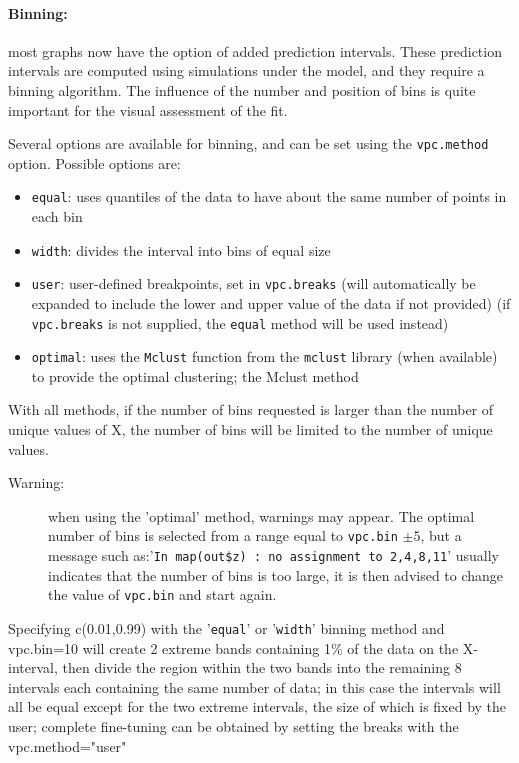 \paragraph{Binning:} most graphs now have the option of added prediction intervals. These prediction intervals are computed using simulations under the model, and they require a binning algorithm. The influence of the number and position of bins is quite important for the visual assessment of the fit.

Several options are available for binning, and can be set using the \texttt{vpc.method} option. Possible options are:
\begin{itemize}
\item \texttt{equal}: uses quantiles of the data to have about the same number of points in each bin
\item \texttt{width}: divides the interval into bins of equal size
\item \texttt{user}: user-defined breakpoints, set in \texttt{vpc.breaks} (will automatically be expanded to include the lower and upper value of the data if not provided) (if \texttt{vpc.breaks} is not supplied, the \texttt{equal} method will be used instead)
\item \texttt{optimal}: uses the \texttt{Mclust} function from the \texttt{mclust} library (when available) to provide the optimal clustering; the Mclust method 
\end{itemize}
With all methods, if the number of bins requested is larger than the number of unique values of X, the number of bins will be limited to the number of unique values.

\begin{description}
\item[Warning:] when using the 'optimal' method, warnings may appear. The optimal number of bins is selected from a range equal to \texttt{vpc.bin} $\pm 5$, but a message such as:'\verb+In map(out$z) : no assignment to 2,4,8,11+' usually indicates that the number of bins is too large, it is then advised to change the value of \texttt{vpc.bin} and start again.
\end{description}

Specifying c(0.01,0.99) with the '\texttt{equal}' or '\texttt{width}' binning method and vpc.bin=10 will create 2 extreme bands containing 1\% of the data on the X-interval, then divide the region within the two bands into the remaining 8 intervals each containing the same number of data; in this case the intervals will all be equal except for the two extreme intervals, the size of which is fixed by the user; complete fine-tuning can be obtained by setting the breaks with the vpc.method="user"

